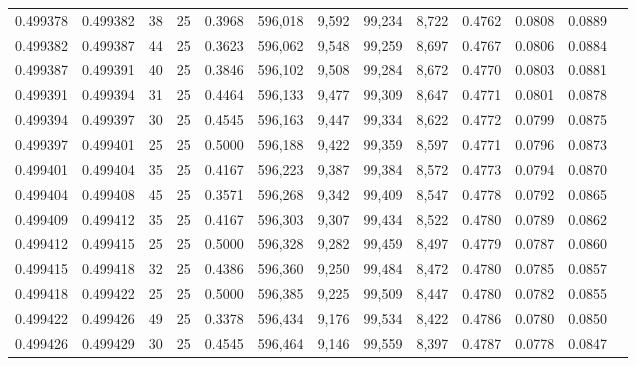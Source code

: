 \begin{tabular}{rrrrrrrrrrrrr}
0.499378 & 0.499382 &    38 &  25 &                                     0.3968 & 596,018 &   9,592 &  99,234 &   8,722 & 0.4762 & 0.0808 & 0.0889 \\
0.499382 & 0.499387 &    44 &  25 &                                     0.3623 & 596,062 &   9,548 &  99,259 &   8,697 & 0.4767 & 0.0806 & 0.0884 \\
0.499387 & 0.499391 &    40 &  25 &                                     0.3846 & 596,102 &   9,508 &  99,284 &   8,672 & 0.4770 & 0.0803 & 0.0881 \\
0.499391 & 0.499394 &    31 &  25 &                                     0.4464 & 596,133 &   9,477 &  99,309 &   8,647 & 0.4771 & 0.0801 & 0.0878 \\
0.499394 & 0.499397 &    30 &  25 &                                     0.4545 & 596,163 &   9,447 &  99,334 &   8,622 & 0.4772 & 0.0799 & 0.0875 \\
0.499397 & 0.499401 &    25 &  25 &                                     0.5000 & 596,188 &   9,422 &  99,359 &   8,597 & 0.4771 & 0.0796 & 0.0873 \\
0.499401 & 0.499404 &    35 &  25 &                                     0.4167 & 596,223 &   9,387 &  99,384 &   8,572 & 0.4773 & 0.0794 & 0.0870 \\
0.499404 & 0.499408 &    45 &  25 &                                     0.3571 & 596,268 &   9,342 &  99,409 &   8,547 & 0.4778 & 0.0792 & 0.0865 \\
0.499409 & 0.499412 &    35 &  25 &                                     0.4167 & 596,303 &   9,307 &  99,434 &   8,522 & 0.4780 & 0.0789 & 0.0862 \\
0.499412 & 0.499415 &    25 &  25 &                                     0.5000 & 596,328 &   9,282 &  99,459 &   8,497 & 0.4779 & 0.0787 & 0.0860 \\
0.499415 & 0.499418 &    32 &  25 &                                     0.4386 & 596,360 &   9,250 &  99,484 &   8,472 & 0.4780 & 0.0785 & 0.0857 \\
0.499418 & 0.499422 &    25 &  25 &                                     0.5000 & 596,385 &   9,225 &  99,509 &   8,447 & 0.4780 & 0.0782 & 0.0855 \\
0.499422 & 0.499426 &    49 &  25 &                                     0.3378 & 596,434 &   9,176 &  99,534 &   8,422 & 0.4786 & 0.0780 & 0.0850 \\
0.499426 & 0.499429 &    30 &  25 &                                     0.4545 & 596,464 &   9,146 &  99,559 &   8,397 & 0.4787 & 0.0778 & 0.0847 \\

\end{tabular}
